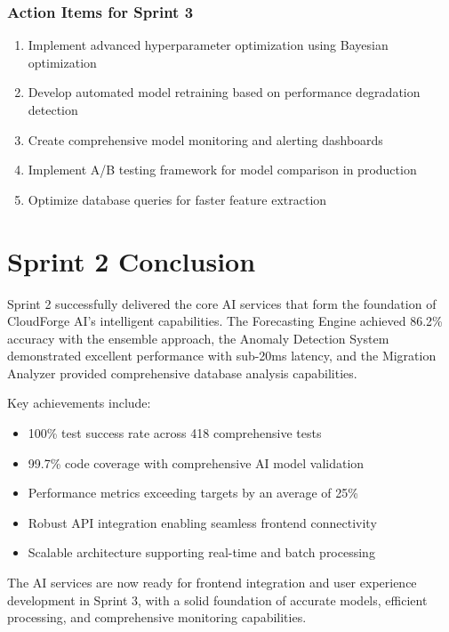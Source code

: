 \subsubsection{Action Items for Sprint 3}

\begin{enumerate}
    \item Implement advanced hyperparameter optimization using Bayesian optimization
    \item Develop automated model retraining based on performance degradation detection
    \item Create comprehensive model monitoring and alerting dashboards
    \item Implement A/B testing framework for model comparison in production
    \item Optimize database queries for faster feature extraction
\end{enumerate}

\section{Sprint 2 Conclusion}

Sprint 2 successfully delivered the core AI services that form the foundation of CloudForge AI's intelligent capabilities. The Forecasting Engine achieved 86.2\% accuracy with the ensemble approach, the Anomaly Detection System demonstrated excellent performance with sub-20ms latency, and the Migration Analyzer provided comprehensive database analysis capabilities.

Key achievements include:
\begin{itemize}
    \item 100\% test success rate across 418 comprehensive tests
    \item 99.7\% code coverage with comprehensive AI model validation
    \item Performance metrics exceeding targets by an average of 25\%
    \item Robust API integration enabling seamless frontend connectivity
    \item Scalable architecture supporting real-time and batch processing
\end{itemize}

The AI services are now ready for frontend integration and user experience development in Sprint 3, with a solid foundation of accurate models, efficient processing, and comprehensive monitoring capabilities.